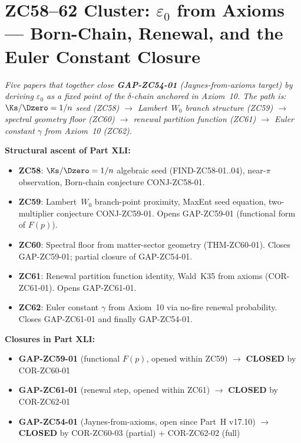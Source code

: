 \documentclass[12pt, a4paper]{article}
\begin{document}
\clearpage

\part{ZC58--62 Cluster: $\varepsilon_0$ from Axioms ---
      Born-Chain, Renewal, and the Euler Constant Closure}
\label{part:zc58-62}

\noindent
\textit{Five papers that together close \textbf{GAP-ZC54-01}
(Jaynes-from-axioms target) by deriving $\varepsilon_0$ as a fixed
point of the $\delta$-chain anchored in Axiom~10. The path is:
$\Ks/\Dzero=1/n$ seed (ZC58) $\to$ Lambert~$W_0$ branch structure
(ZC59) $\to$ spectral geometry floor (ZC60) $\to$ renewal partition
function (ZC61) $\to$ Euler constant $\gamma$ from Axiom~10 (ZC62).}

\medskip
\textbf{Structural ascent of Part XLI:}
\begin{itemize}[leftmargin=1.5em]
\item \textbf{ZC58}: $\Ks/\Dzero=1/n$ algebraic seed (FIND-ZC58-01..04),
  near-$\pi$ observation, Born-chain conjecture CONJ-ZC58-01.
\item \textbf{ZC59}: Lambert~$W_0$ branch-point proximity, MaxEnt seed
  equation, two-multiplier conjecture CONJ-ZC59-01.
  Opens GAP-ZC59-01 (functional form of $F(p)$).
\item \textbf{ZC60}: Spectral floor from matter-sector geometry
  (THM-ZC60-01). Closes GAP-ZC59-01; partial closure of GAP-ZC54-01.
\item \textbf{ZC61}: Renewal partition function identity, Wald~K35
  from axioms (COR-ZC61-01). Opens GAP-ZC61-01.
\item \textbf{ZC62}: Euler constant $\gamma$ from Axiom~10 via no-fire
  renewal probability. Closes GAP-ZC61-01 and finally GAP-ZC54-01.
\end{itemize}

\medskip
\textbf{Closures in Part XLI:}
\begin{itemize}[leftmargin=1.5em]
\item \textbf{GAP-ZC59-01} (functional $F(p)$, opened within ZC59)
  $\to$ \textbf{CLOSED} by COR-ZC60-01
\item \textbf{GAP-ZC61-01} (renewal step, opened within ZC61)
  $\to$ \textbf{CLOSED} by COR-ZC62-01
\item \textbf{GAP-ZC54-01} (Jaynes-from-axioms, open since
  Part~H v17.10) $\to$ \textbf{CLOSED} by
  COR-ZC60-03 (partial) + COR-ZC62-02 (full)
\end{itemize}
\end{document}

